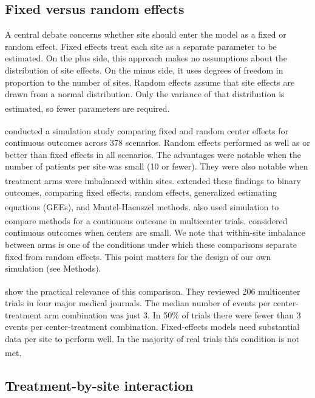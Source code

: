 \documentclass[
  11pt,
]{article}
\begin{document}
\subsection{Fixed versus random effects}\label{fixed-versus-random-effects}

A central debate concerns whether site should enter the model as
a fixed or random effect. Fixed effects treat each site as a
separate parameter to be estimated. On the plus side, this
approach makes no assumptions about the distribution of site
effects. On the minus side, it uses degrees of freedom in
proportion to the number of sites. Random effects assume that
site effects are drawn from a normal distribution. Only the
variance of that distribution is estimated, so fewer parameters
are required\textsuperscript{}.

\textsuperscript{} conducted a simulation study comparing fixed
and random center effects for continuous outcomes across 378
scenarios. Random effects performed as well as or better than
fixed effects in all scenarios. The advantages were notable when
the number of patients per site was small (10 or fewer). They
were also notable when treatment arms were imbalanced within
sites.\textsuperscript{} extended these findings to binary
outcomes, comparing fixed effects, random effects, generalized
estimating equations (GEEs), and Mantel-Haenszel methods.\textsuperscript{} also used simulation to compare methods for a
continuous outcome in multicenter trials.\textsuperscript{}
considered continuous outcomes when centers are small. We note that
within-site imbalance between arms is one of the conditions under
which these comparisons separate fixed from random effects. This
point matters for the design of our own simulation (see Methods).

\textsuperscript{} show the practical relevance of this
comparison. They reviewed 206 multicenter trials in four major
medical journals. The median number of events per
center-treatment arm combination was just 3. In 50\% of trials
there were fewer than 3 events per center-treatment combination.
Fixed-effects models need substantial data per site to perform
well. In the majority of real trials this condition is not met\textsuperscript{}.

\subsection{Treatment-by-site interaction}\label{treatment-by-site-interaction}
\end{document}
